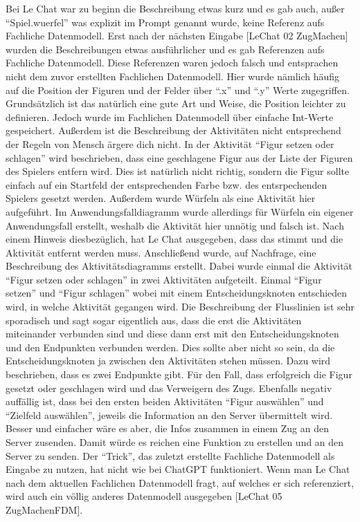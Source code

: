 Bei Le Chat war zu beginn die Beschreibung etwas kurz und es gab auch, außer ``Spiel.wuerfel'' was explizit im Prompt genannt wurde, keine Referenz aufs Fachliche Datenmodell.
Erst nach der nächsten Eingabe [LeChat 02 ZugMachen] wurden die Beschreibungen etwas ausführlicher und es gab Referenzen aufs Fachliche Datenmodell. Diese Referenzen waren 
jedoch falsch und entsprachen nicht dem zuvor erstellten Fachlichen Datenmodell. Hier wurde nämlich häufig auf die Position der Figuren und der Felder über ``.x'' und ``.y''
Werte zugegriffen. Grundsätzlich ist das natürlich eine gute Art und Weise, die Position leichter zu definieren. Jedoch wurde im Fachlichen Datenmodell über einfache Int-Werte
gespeichert. Außerdem ist die Beschreibung der Aktivitäten nicht entsprechend der Regeln von Mensch ärgere dich nicht. In der Aktivität ``Figur setzen oder schlagen'' wird 
beschrieben, dass eine geschlagene Figur aus der Liste der Figuren des Spielers entfern wird. Dies ist natürlich nicht richtig, sondern die Figur sollte einfach auf ein Startfeld 
der entsprechenden Farbe bzw. des entsrpechenden Spielers gesetzt werden. Außerdem wurde Würfeln als eine Aktivität hier aufgeführt. Im Anwendungsfalldiagramm wurde allerdings
für Würfeln ein eigener Anwendungsfall erstellt, weshalb die Aktivität hier unnötig und falsch ist. Nach einem Hinweis diesbezüglich, hat Le Chat ausgegeben, dass das stimmt und
die Aktivität entfernt werden muss. Anschließend wurde, auf Nachfrage, eine Beschreibung des Aktivitätsdiagramms erstellt. Dabei wurde einmal die Aktivität ``Figur setzen oder 
schlagen'' in zwei Aktivitäten aufgeteilt. Einmal ``Figur setzen'' und ``Figur schlagen'' wobei mit einem Entscheidungsknoten entschieden wird, in welche Aktivität gegangen wird.
Die Beschreibung der Flusslinien ist sehr sporadisch und sagt sogar eigentlich aus, dass die erst die Aktivitäten miteinander verbunden sind und diese dann erst mit den 
Entscheidungsknoten und den Endpunkten verbunden werden. Dies sollte aber nicht so sein, da die Entscheidungsknoten ja zwischen den Aktivitäten stehen müssen. Dazu wird beschrieben, 
dass es zwei Endpunkte gibt. Für den Fall, dass erfolgreich die Figur gesetzt oder geschlagen wird und das Verweigern des Zugs. Ebenfalls negativ auffällig ist, dass bei den ersten
beiden Aktivitäten ``Figur auswählen'' und ``Zielfeld auswählen'', jeweils die Information an den Server übermittelt wird. Besser und einfacher wäre es aber, die Infos zusammen in einem
Zug an den Server zusenden. Damit würde es reichen eine Funktion zu erstellen und an den Server zu senden. Der ``Trick'', das zuletzt erstellte Fachliche Datenmodell als Eingabe 
zu nutzen, hat nicht wie bei ChatGPT funktioniert. Wenn man Le Chat nach dem aktuellen Fachlichen Datenmodell fragt, auf welches er sich referenziert, wird auch ein völlig anderes
Datenmodell ausgegeben [LeChat 05 ZugMachenFDM].\\

